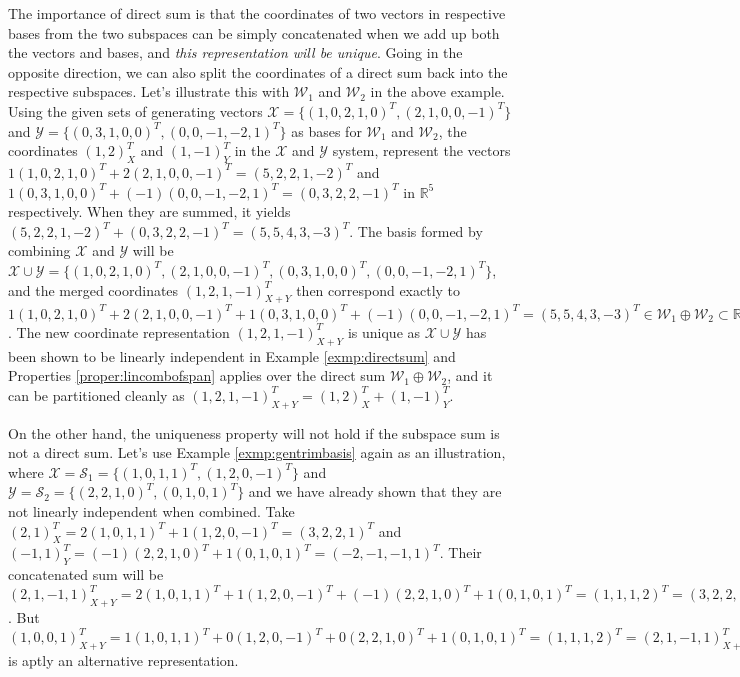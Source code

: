 The importance of direct sum is that the coordinates of two vectors in respective bases from the two subspaces can be simply concatenated when we add up both the vectors and bases, and \textit{this representation will be unique}. Going in the opposite direction, we can also split the coordinates of a direct sum back into the respective subspaces. Let's illustrate this with $\mathcal{W}_1$ and $\mathcal{W}_2$ in the above example. Using the given sets of generating vectors $\mathcal{X} = \{(1,0,2,1,0)^T, (2,1,0,0,-1)^T\}$ and $\mathcal{Y} = \{(0,3,1,0,0)^T, (0,0,-1,-2,1)^T\}$ as bases for $\mathcal{W}_1$ and $\mathcal{W}_2$, the coordinates $(1,2)_X^T$ and $(1,-1)^T_Y$ in the $\mathcal{X}$ and $\mathcal{Y}$ system, represent the vectors $1(1,0,2,1,0)^T + 2(2,1,0,0,-1)^T = (5,2,2,1,-2)^T$ and $1(0,3,1,0,0)^T + (-1)(0,0,-1,-2,1)^T = (0,3,2,2,-1)^T$ in $\mathbb{R}^5$ respectively. When they are summed, it yields $(5,2,2,1,-2)^T + (0,3,2,2,-1)^T = (5,5,4,3,-3)^T$. The basis formed by combining $\mathcal{X}$ and $\mathcal{Y}$ will be $\mathcal{X} \cup \mathcal{Y} = \{(1,0,2,1,0)^T, (2,1,0,0,-1)^T, (0,3,1,0,0)^T, (0,0,-1,-2,1)^T\}$, and the merged coordinates $(1,2,1,-1)_{X+Y}^T$ then correspond exactly to \\ $1(1,0,2,1,0)^T + 2(2,1,0,0,-1)^T + 1(0,3,1,0,0)^T + (-1)(0,0,-1,-2,1)^T = (5,5,4,3,-3)^T \in \mathcal{W}_1 \oplus \mathcal{W}_2 \subset \mathbb{R}^5$. The new coordinate representation $(1,2,1,-1)_{X+Y}^T$ is unique as $\mathcal{X} \cup \mathcal{Y}$ has been shown to be linearly independent in Example \ref{exmp:directsum} and Properties \ref{proper:lincombofspan} applies over the direct sum $\mathcal{W}_1 \oplus \mathcal{W}_2$, and it can be partitioned cleanly as $(1,2,1,-1)_{X+Y}^T = (1,2)_X^T + (1,-1)_Y^T$.

On the other hand, the uniqueness property will not hold if the subspace sum is not a direct sum. Let's use Example \ref{exmp:gentrimbasis} again as an illustration, where $\mathcal{X} = \mathcal{S}_1 = \{(1,0,1,1)^T, (1,2,0,-1)^T\}$ and $\mathcal{Y} = \mathcal{S}_2 = \{(2,2,1,0)^T, (0,1,0,1)^T\}$ and we have already shown that they are not linearly independent when combined. Take $(2,1)_X^T = 2(1,0,1,1)^T + 1(1,2,0,-1)^T = (3,2,2,1)^T$ and $(-1,1)_Y^T = (-1)(2,2,1,0)^T + 1(0,1,0,1)^T = (-2,-1,-1,1)^T$. Their concatenated sum will be $(2,1,-1,1)_{X+Y}^T = 2(1,0,1,1)^T + 1(1,2,0,-1)^T + (-1)(2,2,1,0)^T + 1(0,1,0,1)^T = (1,1,1,2)^T = (3,2,2,1)^T + (-2,-1,-1,1)^T$. But $(1,0,0,1)_{X+Y}^T = 1(1,0,1,1)^T + 0(1,2,0,-1)^T + 0(2,2,1,0)^T + 1(0,1,0,1)^T = (1,1,1,2)^T = (2,1,-1,1)_{X+Y}^T$ is aptly an alternative representation.


